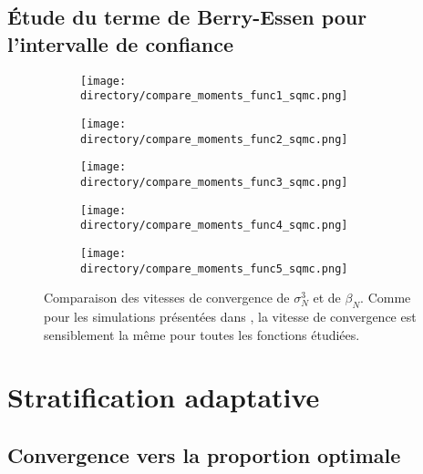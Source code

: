 \documentclass[12pt,a4paper]{report}
\def \directory {/home/jonathan/Programmation/C++/Projet_C++_S2/Images}
\begin{document}
\subsection{Étude du terme de Berry-Essen pour l'intervalle de confiance}
\begin{figure}[H]
\centering
	\begin{subfigure}[scale=1]{0.45\textwidth}
			\texttt{[image: \\directory/compare\_moments\_func1\_sqmc.png]}
	\end{subfigure}
	\hfill
	\begin{subfigure}[scale=1]{0.45\textwidth}
			\texttt{[image: \\directory/compare\_moments\_func2\_sqmc.png]}
	\end{subfigure}
	\vspace{30pt}
	\begin{subfigure}[scale=1]{0.45\textwidth}
			\texttt{[image: \\directory/compare\_moments\_func3\_sqmc.png]}
	\end{subfigure}
	\hfill
	\begin{subfigure}[scale=1]{0.45\textwidth}
			\texttt{[image: \\directory/compare\_moments\_func4\_sqmc.png]}
	\end{subfigure}
	\vspace{30pt}
	\begin{subfigure}[scale=1]{0.45\textwidth}
			\texttt{[image: \\directory/compare\_moments\_func5\_sqmc.png]}
	\end{subfigure}

	
\caption{\small Comparaison des vitesses de convergence de $\sigma^{3}_{N}$ et de $\beta_{N}$. Comme pour les simulations présentées dans \cite{Tu04}, la vitesse de convergence est sensiblement la même pour toutes les fonctions étudiées.}
\label{fig:rqmc_moments}
\end{figure}


\section{Stratification adaptative}

\subsection{Convergence vers la proportion optimale}
\end{document}
